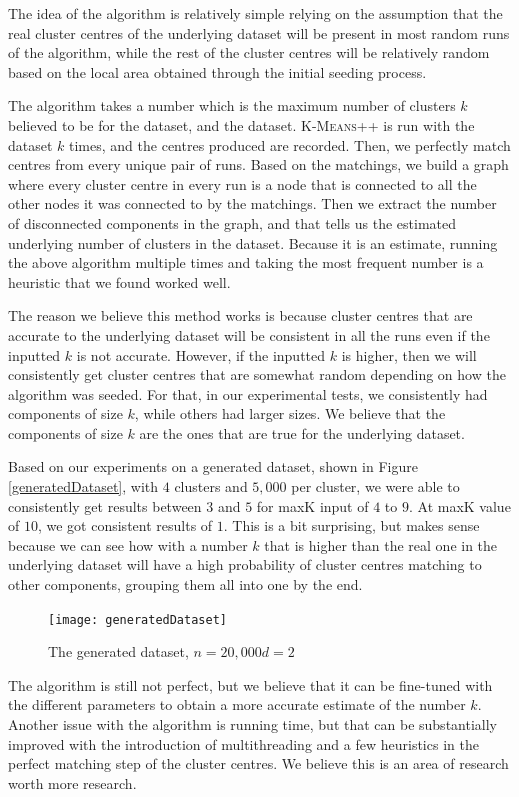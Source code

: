 \documentclass[12pt]{dalthesis}
\newcommand*{\kmeansn}{\textsc{K-Means}} %
\begin{document}
The idea of the algorithm is relatively simple relying on the assumption that the real cluster centres of the underlying dataset will be present in most random runs of the algorithm, while the rest of the cluster centres will be relatively random based on the local area obtained through the initial seeding process. 

The algorithm takes a number which is the maximum number of clusters $k$ believed to be for the dataset, and the dataset. \kmeansn++ is run with the dataset $k$ times, and the centres produced are recorded. Then, we perfectly match centres from every unique pair of runs. Based on the matchings, we build a graph where every cluster centre in every run is a node that is connected to all the other nodes it was connected to by the matchings. Then we extract the number of disconnected components in the graph, and that tells us the estimated underlying number of clusters in the dataset. Because it is an estimate, running the above algorithm multiple times and taking the most frequent number is a heuristic that we found worked well.

The reason we believe this method works is because cluster centres that are accurate to the underlying dataset will be consistent in all the runs even if the inputted $k$ is not accurate. However, if the inputted $k$ is higher, then we will consistently get cluster centres that are somewhat random depending on how the algorithm was seeded. For that, in our experimental tests, we consistently had components of size $k$, while others had larger sizes. We believe that the components of size $k$ are the ones that are true for the underlying dataset.

Based on our experiments on a generated dataset, shown in Figure \ref{generatedDataset}, with $4$ clusters and $5,000$ per cluster, we were able to consistently get results between $3$ and $5$ for maxK input of $4$ to $9$. At maxK value of $10$, we got consistent results of $1$. This is a bit surprising, but makes sense because we can see how with a number $k$ that is higher than the real one in the underlying dataset will have a high probability of cluster centres matching to other components, grouping them all into one by the end.

\begin{figure}[h]
  \texttt{[image: generatedDataset]}
  \caption{The generated dataset, $n=20,000 d=2$} 
  \label{fig:generatedDataset}
\end{figure}

The algorithm is still not perfect, but we believe that it can be fine-tuned with the different parameters to obtain a more accurate estimate of the number $k$. Another issue with the algorithm is running time, but that can be substantially improved with the introduction of multithreading and a few heuristics in the perfect matching step of the cluster centres. We believe this is an area of research worth more research.
\end{document}
